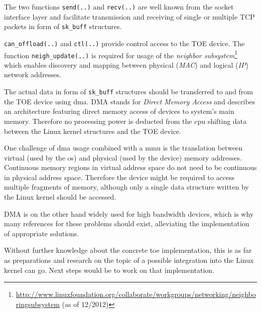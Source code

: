 The two functions \texttt{send(..)} and \texttt{recv(..)} are well known from the socket interface layer and facilitate transmission and receiving of single or multiple TCP packets in form of \texttt{sk\_buff} structures.

\texttt{can\_offload(..)} and \texttt{ctl(..)} provide control access to the TOE device. The function \texttt{neigh\_update(..)} is required for usage of the \textit{neighbor subsystem}\footnote{\url{http://www.linuxfoundation.org/collaborate/workgroups/networking/neighboringsubsystem} (as of 12/2012)} which enables discovery and mapping between physical (\textit{MAC}) and logical (\textit{IP}) network addresses.

The actual data in form of \texttt{sk\_buff} structures should be transferred to and from the TOE device using \gls{dma}. DMA stands for \textit{Direct Memory Access} and describes an architecture featuring direct memory access of devices to system's main memory. Therefore no processing power is deducted from the \gls{cpu} shifting data between the Linux kernel structures and the TOE device.

One challenge of \gls{dma} usage combined with a \gls{mmu} is the translation between virtual (used by the \gls{os}) and physical (used by the device) memory addresses. Continuous memory regions in virtual address space do not need to be continuous in physical address space. Therefore the device might be required to access multiple fragments of memory, although only a single data structure written by the Linux kernel should be accessed.

DMA is on the other hand widely used for high bandwidth devices, which is why many references for these problems should exist, alleviating the implementation of appropriate solutions.

Without further knowledge about the concrete \gls{toe} implementation, this is as far as preparations and research on the topic of a possible integration into the Linux kernel can go. Next steps would be to work on that implementation.